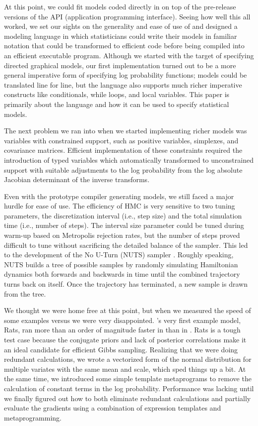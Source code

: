 \documentclass[article]{jss}
\begin{document}
At this point, we could fit models coded directly in  on
top of the pre-release versions of the  API
(application programming interface).  Seeing how well this all worked,
we set our sights on the generality and ease of use of 
and designed a modeling language in which statisticians could write
their models in familiar notation that could be transformed to
efficient  code before being compiled into an efficient
executable program.  Although we started with the target of specifying
directed graphical models, our first implementation turned out to be a
more general imperative form of specifying log probability functions;
 models could be translated line for line, but the
 language also supports much richer imperative
constructs like conditionals, while loops, and local variables.
This paper is primarily about the  language and how
it can be used to specify statistical models.
 
The next problem we ran into when we started implementing richer
models was variables with constrained support, such as positive variables, 
simplexes, and covariance matrices.  
Efficient implementation of these constraints
required the introduction of typed variables which automatically transformed to
unconstrained support with suitable adjustments to the log probability
from the log absolute Jacobian determinant of the inverse transforms.

Even with the prototype compiler generating models, we still faced a
major hurdle for ease of use. The efficiency of HMC is very sensitive
to two tuning parameters, the discretization interval (i.e., step
size) and the total simulation time (i.e., number of steps).  The
interval size parameter could be tuned during warm-up based on
Metropolis rejection rates, but the number of steps proved difficult
to tune without sacrificing the detailed balance of the sampler.  This
led to the development of the No U-Turn (NUTS) sampler
\citep{HoffmanGelman:2011}.  Roughly speaking, NUTS builds a tree of
possible samples by randomly simulating Hamiltonian dynamics both
forwards and backwards in time until the combined trajectory turns
back on itself.  Once the trajectory has terminated, a new sample is
drawn from the tree.

We thought we were home free at this point, but when we measured the
speed of some  examples versus  we were
very disappointed.  's very first example model, Rats,
ran more than an order of magnitude faster in  than in
.  Rats is a tough test case because the conjugate
priors and lack of posterior correlations make it an ideal candidate
for efficient Gibbs sampling.  Realizing that we were doing redundant
calculations, we wrote a vectorized form of the normal distribution
for multiple variates with the same mean and scale, which sped things
up a bit. At the same time, we introduced some simple template
metaprograms to remove the calculation of constant terms in the log
probability.  Performance was lacking until we finally figured out how
to both eliminate redundant calculations and partially evaluate the
gradients using a combination of expression templates and
metaprogramming.
\end{document}
